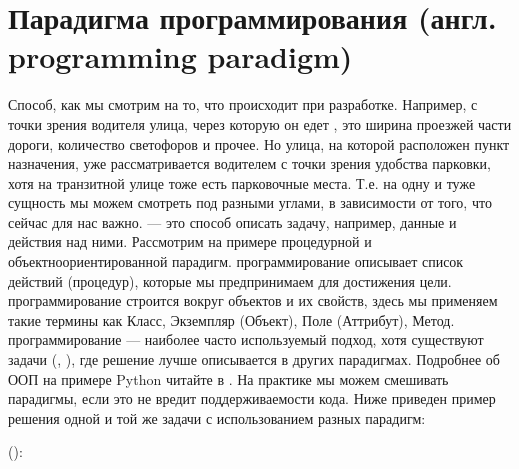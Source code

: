 \documentclass[letterpaper,10pt,russian]{sphinxmanual}
\begin{document}
\section{Парадигма программирования (англ. programming paradigm)}
\label{\detokenize{educational_materials/terms/content:programming-paradigm}}
\sphinxAtStartPar
Способ, как мы смотрим на то, что происходит при разработке. Например, с точки зрения водителя улица, через которую он едет , это ширина проезжей части дороги, количество светофоров и прочее. Но улица, на которой расположен пункт назначения, уже рассматривается водителем с точки зрения удобства парковки, хотя на транзитной улице тоже есть парковочные места. Т.е. на одну и туже сущность  мы можем смотреть под разными углами, в зависимости от того, что сейчас для нас важно.  — это способ описать задачу, например, данные и действия над ними.
Рассмотрим на примере процедурной и объектно\sphinxhyphen{}ориентированной парадигм.  программирование описывает список действий (процедур), которые мы предпринимаем для достижения цели.  программирование строится вокруг объектов и их свойств, здесь мы применяем такие термины как Класс, Экземпляр (Объект), Поле (Аттрибут), Метод.  программирование — наиболее часто используемый подход, хотя существуют задачи (, ), где решение лучше описывается в других парадигмах. Подробнее об ООП на примере Python читайте в . На практике мы можем смешивать парадигмы, если это не вредит поддерживаемости кода. Ниже приведен пример решения одной и той же задачи с использованием разных парадигм:

\sphinxAtStartPar
():
\end{document}
